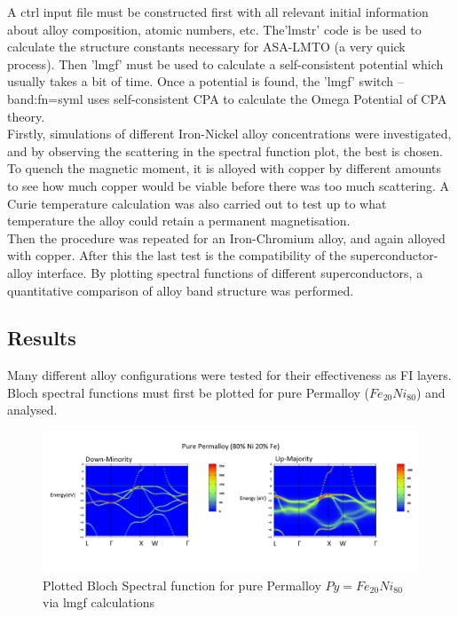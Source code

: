 \documentclass[12pt]{article}
\begin{document}
A ctrl input file must be constructed first with all relevant initial information about alloy composition, atomic numbers, etc.
The'lmstr' code is be used to calculate the structure constants necessary for ASA-LMTO (a very quick process). Then 'lmgf' must be used to calculate a self-consistent potential which usually takes a bit of time. Once a potential is found, the 'lmgf' switch --band:fn=syml uses self-consistent CPA to calculate the Omega Potential of CPA theory\cite{turek}.
\\Firstly, simulations of different Iron-Nickel alloy concentrations were investigated, and by observing the scattering in the spectral function plot, the best is chosen. To quench the magnetic moment, it is alloyed with copper by different amounts to see how much copper would be viable before there was too much scattering. A Curie temperature calculation was also carried out to test up to what temperature the alloy could retain a permanent magnetisation.
\\Then the procedure was repeated for an Iron-Chromium alloy, and again alloyed with copper. After this the last test is the compatibility of the superconductor-alloy interface. By plotting spectral functions of different superconductors, a quantitative comparison of alloy band structure was performed.

\subsection{Results}

Many different alloy configurations were tested for their effectiveness as FI layers. Bloch spectral functions must first be plotted for pure Permalloy ($Fe_{20}Ni_{80}$) and analysed. 
\begin{figure}[htp]
    \centering
    \begin{measuredfigure}
    \includegraphics[scale=0.40]{specfunc/purepy}
    \caption{Plotted Bloch Spectral function for pure Permalloy $Py=Fe_{20}Ni_{80}$ via lmgf calculations}
    \end{measuredfigure}
    \end{figure}
\end{document}
